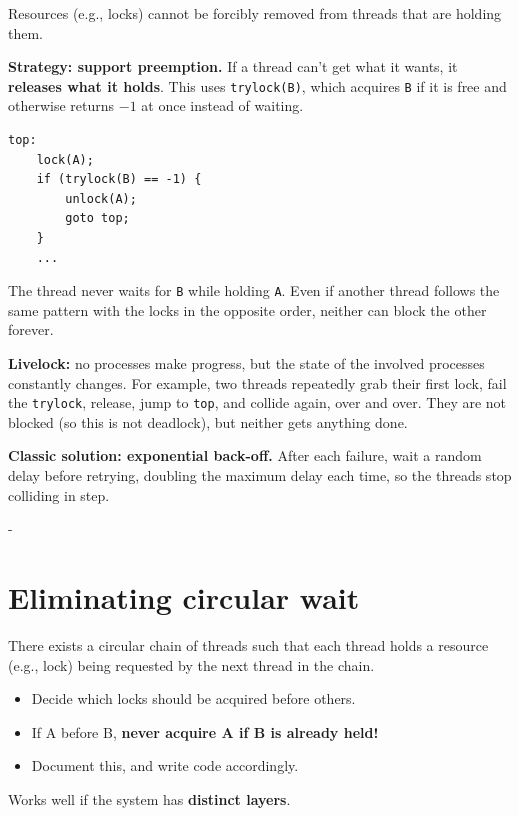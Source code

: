 \documentclass[11pt,a4paper]{article}
\makeatletter
\newcommand{\keepspace}[1]{\par\penalty-100\begingroup
  \setlength{\dimen@}{#1}\dimen@ii\pagegoal\advance\dimen@ii-\pagetotal
  \ifdim\dimen@>\dimen@ii\ifdim\dimen@ii>\z@\vfil\fi\break\fi\endgroup}
\makeatother
\begin{document}
\begin{defbox}[No preemption]
Resources (e.g., locks) cannot be forcibly removed from threads that are
holding them.
\end{defbox}

\textbf{Strategy: support preemption.} If a thread can't get what it wants,
it \textbf{releases what it holds}. This uses \texttt{trylock(B)}, which
acquires \texttt{B} if it is free and otherwise returns \(-1\) at once
instead of waiting.

\begin{lstlisting}
top:
    lock(A);
    if (trylock(B) == -1) {
        unlock(A);
        goto top;
    }
    ...
\end{lstlisting}

The thread never waits for \texttt{B} while holding \texttt{A}. Even if
another thread follows the same pattern with the locks in the opposite order,
neither can block the other forever.

\begin{warnbox}[Disadvantages?]
\textbf{Livelock:} no processes make progress, but the state of the involved
processes constantly changes. For example, two threads repeatedly grab their
first lock, fail the \texttt{trylock}, release, jump to \texttt{top}, and
collide again, over and over. They are not blocked (so this is not deadlock),
but neither gets anything done.

\textbf{Classic solution: exponential back-off.} After each failure, wait a
random delay before retrying, doubling the maximum delay each time, so the
threads stop colliding in step.
\end{warnbox}

\keepspace{12\baselineskip}
\section{Eliminating circular wait}

\begin{defbox}
There exists a circular chain of threads such that each thread holds a
resource (e.g., lock) being requested by the next thread in the chain.
\end{defbox}

\begin{keybox}[Strategy]
\begin{itemize}
  \item Decide which locks should be acquired before others.
  \item If A before B, \textbf{never acquire A if B is already held!}
  \item Document this, and write code accordingly.
\end{itemize}
Works well if the system has \textbf{distinct layers}.
\end{keybox}
\end{document}
